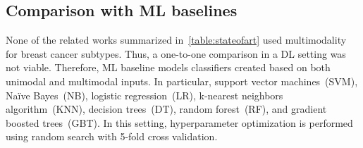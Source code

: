 \subsection{Comparison with ML baselines}
None of the related works summarized in~\cref{table:stateofart} used multimodality for breast cancer subtypes. Thus, a one-to-one comparison in a DL setting was not viable. Therefore, ML baseline models classifiers created based on both unimodal and multimodal inputs. In particular, support vector machines~(SVM), Na{\"i}ve Bayes~(NB), logistic regression~(LR), k-nearest neighbors algorithm~(KNN), decision trees~(DT), random forest~(RF), and gradient boosted trees~(GBT). In this setting, hyperparameter optimization is performed using random search with 5-fold cross validation. 

